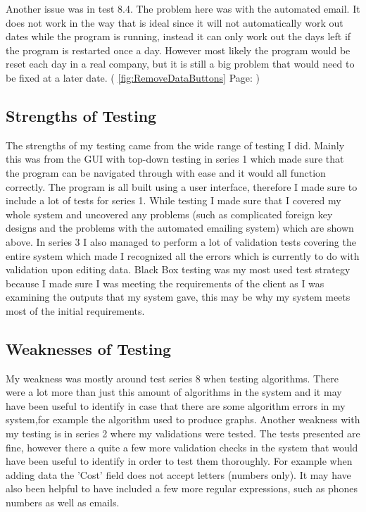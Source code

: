 \par Another issue was in test 8.4. The problem here was with the automated email. It does not work in the way that is ideal since it will not automatically work out dates while the program is running, instead it can only work out the days left if the program is restarted once a day. However most likely the program would be reset each day in a real company, but it is still a big problem that would need to be fixed at a later date. ( \ref{fig:RemoveDataButtons} Page: \pageref{fig:RemoveDataButtons})

\subsection{Strengths of Testing}

The strengths of my testing came from the wide range of testing I did. Mainly this was from the GUI with top-down testing in series 1 which made sure that the program can be navigated through with ease and it would all function correctly. The program is all built using a user interface, therefore I made sure to include a lot of tests for series 1. While testing I made sure that I covered my whole system and uncovered any problems (such as complicated foreign key designs and the problems with the automated emailing system) which are shown above. In series 3 I also managed to perform a lot of validation tests covering the entire system which made I recognized all the errors which is currently to do with validation upon editing data. Black Box testing was my most used test strategy because I made sure I was meeting the requirements of the client as I was examining the outputs that my system gave, this may be why my system meets most of the initial requirements.

\subsection{Weaknesses of Testing}

My weakness was mostly around test series 8 when testing algorithms. There were a lot more than just this amount of algorithms in the system and it may have been useful to identify in case that there are some algorithm errors in my system,for example the algorithm used to produce graphs. Another weakness with my testing is in series 2 where my validations were tested. The tests presented are fine, however there a quite a few more validation checks in the system that would have been useful to identify in order to test them thoroughly. For example when adding data the 'Cost' field does not accept letters (numbers only). It may have also been helpful to have included a few more regular expressions, such as phones numbers as well as emails.

